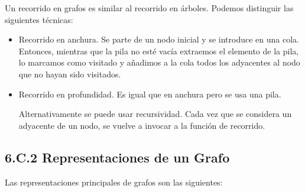 Un recorrido en grafos es similar al recorrido en árboles. Podemos distinguir las siguientes técnicas:

\begin{itemize}
\item Recorrido en anchura. Se parte de un nodo inicial y se introduce en una cola.
Entonces, mientras que la pila no esté vacía extraemos el elemento de la pila, lo marcamos como visitado y añadimos a la cola todos los adyacentes al nodo que no hayan sido visitados. 

\item Recorrido en profundidad. Es igual que en anchura pero se usa una pila. 

Alternativamente se puede usar recursividad. Cada vez que se considera un adyacente de un nodo, se vuelve a invocar a la función de recorrido.

\end{itemize}



\subsection*{6.C.2 Representaciones de un Grafo}
\label{sec:RepresentacionesGrafo}

Las  representaciones principales de grafos son las siguientes:

